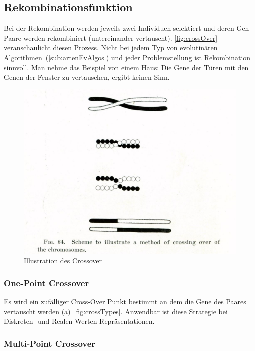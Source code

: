     \subsection{Rekombinationsfunktion}

        Bei der Rekombination werden jeweils zwei Individuen selektiert und
        deren Gen-Paare werden rekombiniert (untereinander vertauscht).
        \vref{fig:crossOver} veranschaulicht diesen Prozess.
        Nicht bei jedem Typ von evolutinären Algorithmen~(\vref{sub:artenEvAlgos}) und jeder Problemstellung ist Rekombination sinnvoll.
        Man nehme das Beispiel von einem Haus: Die Gene der Türen mit den Genen der Fenster zu vertauschen, ergibt keinen Sinn.


        \begin{figure}[H]
          \includegraphics[scale=0.3, center]{graphics/morgan_crossover}
          \caption{Illustration des Crossover~\cite[]{WikipediaEN:crossOver}\label{fig:crossOver}}
        \end{figure}

        \subsubsection{One-Point Crossover}

        Es wird ein zufälliger Cross-Over Punkt bestimmt an dem die Gene des Paares vertauscht werden (a)~\vref{fig:crossTypes}.
        Anwendbar ist diese Strategie bei Diskreten- und Realen-Werten-Repräsentationen.

        \subsubsection{Multi-Point Crossover}

